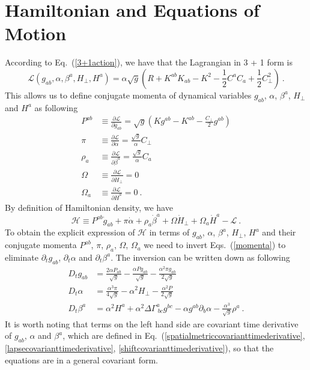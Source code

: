 \section{Hamiltonian and Equations of Motion}\label{hamiltonian}
According to Eq.~(\ref{3+1action}), we have that the Lagrangian in 3 + 1 form is
\begin{equation}
\mathscr{L}\left(g_{ab}, \alpha, \beta^{a}, H_{\perp}, H^{a}\right) = \alpha \sqrt{g} \left( R + K^{ab}K_{ab} - K^{2} - \frac{1}{2}C^{a}C_{a} + \frac{1}{2}C_{\perp}^{2}\right) \ .
\end{equation}
This allows us to define conjugate momenta of dynamical variables $g_{ab}$, $\alpha$, $\beta^{a}$, $H_{\perp}$ and $H^{a}$ as following
\begin{subequations}\label{momenta}
\begin{align}
P^{ab} & \equiv \frac{\partial \mathscr{L}}{\partial {\dot g}_{ab}} = \sqrt{g}\left(Kg^{ab} - K^{ab} - \frac{C_{\perp}}{2}g^{ab}\right)\\
\pi & \equiv \frac{\partial \mathscr{L}}{\partial {\dot \alpha}} = \frac{\sqrt{g}}{\alpha}C_{\perp}\\
\rho_{a} & \equiv \frac{\partial \mathscr{L}}{\partial {\dot \beta}^{a}} = \frac{\sqrt{g}}{\alpha}C_{a}\\
\Omega & \equiv \frac{\partial \mathscr{L}}{\partial {\dot H}_{\perp}} = 0\\
\Omega_{a} & \equiv \frac{\partial \mathscr{L}}{\partial {\dot H}^{a}} = 0 \ .  
\end{align}
\end{subequations}
By definition of Hamiltonian density, we have
\begin{equation}
\mathscr{H} \equiv P^{ab}{\dot g}_{ab} + \pi{\dot \alpha} + \rho_{a}{\dot \beta}^{a} + \Omega {\dot H}_{\perp} + \Omega_{a}{\dot H}^{a} - \mathscr{L} \ . 
\end{equation}
To obtain the explicit expression of $\mathscr{H}$ in terms of $g_{ab}$, $\alpha$, $\beta^{a}$, $H_{\perp}$, $H^{a}$ and their conjugate momenta $P^{ab}$, $\pi$, $\rho_{a}$, $\Omega$, $\Omega_{a}$ we need to invert Eqs.~(\ref{momenta}) to eliminate $\partial_{t}g_{ab}$, $\partial_{t}\alpha$ and $\partial_{t}\beta^{a}$. The inversion can be written down as following
\begin{subequations}
\begin{align}
D_{t}g_{ab} & = \frac{2\alpha P_{ab}}{\sqrt{g}} - \frac{\alpha P g_{ab}}{\sqrt{g}} - \frac{\alpha^{2}\pi g_{ab}}{2\sqrt{g}}\\
D_{t}\alpha & = \frac{\alpha^{3}\pi}{4\sqrt{g}} - \alpha^{2}H_{\perp} - \frac{\alpha^{2}P}{2\sqrt{g}}\\
D_{t}\beta^{a} & = \alpha^{2}H^{a} + \alpha^{2}\Delta \Gamma^{a}_{~bc}g^{bc} - \alpha g^{ab}\partial_{b}\alpha - \frac{\alpha^{3}}{\sqrt{g}}\rho^{a} \ .
\end{align}
\end{subequations}
It is worth noting that terms on the left hand side are covariant time derivative of $g_{ab}$, $\alpha$ and $\beta^{a}$, which are defined in Eq.~(\ref{spatialmetriccovarianttimederivative}, \ref{lapsecovarianttimederivative}, \ref{shiftcovarianttimederivative}), so that the equations are in a general covariant form. 

